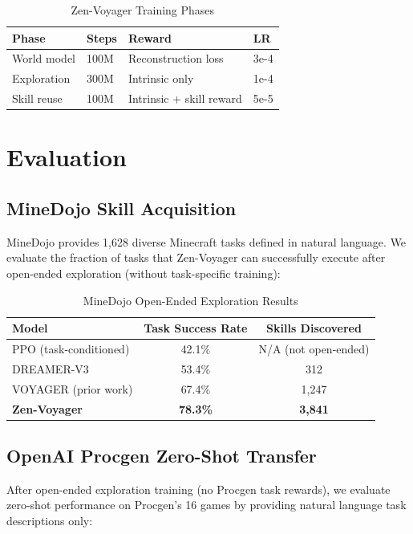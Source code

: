 \documentclass[11pt,a4paper]{article}
\begin{document}
\begin{table}[H]
\centering
\begin{tabular}{llll}
\toprule
\textbf{Phase} & \textbf{Steps} & \textbf{Reward} & \textbf{LR} \\
\midrule
World model & 100M & Reconstruction loss & 3e-4 \\
Exploration & 300M & Intrinsic only & 1e-4 \\
Skill reuse & 100M & Intrinsic + skill reward & 5e-5 \\
\bottomrule
\end{tabular}
\caption{Zen-Voyager Training Phases}
\end{table}

\section{Evaluation}

\subsection{MineDojo Skill Acquisition}

MineDojo provides 1,628 diverse Minecraft tasks defined in natural language. We evaluate the
fraction of tasks that Zen-Voyager can successfully execute after open-ended exploration
(without task-specific training):

\begin{table}[H]
\centering
\begin{tabular}{lcc}
\toprule
\textbf{Model} & \textbf{Task Success Rate} & \textbf{Skills Discovered} \\
\midrule
PPO (task-conditioned) & 42.1\% & N/A (not open-ended) \\
DREAMER-V3 & 53.4\% & 312 \\
VOYAGER (prior work) & 67.4\% & 1,247 \\
\textbf{Zen-Voyager} & \textbf{78.3\%} & \textbf{3,841} \\
\bottomrule
\end{tabular}
\caption{MineDojo Open-Ended Exploration Results}
\end{table}

\subsection{OpenAI Procgen Zero-Shot Transfer}

After open-ended exploration training (no Procgen task rewards), we evaluate zero-shot
performance on Procgen's 16 games by providing natural language task descriptions only:
\end{document}
